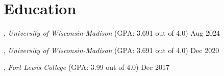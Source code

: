 \section{Education}

, \textit{University of Wisconsin-Madison} (GPA: 3.691 out of 4.0) \hfill Aug 2024

, \textit{University of Wisconsin-Madison} (GPA: 3.691 out of 4.0) \hfill Dec 2020

, \textit{Fort Lewis College} (GPA: 3.99 out of 4.0) \hfill	Dec 2017

\skills{ }

